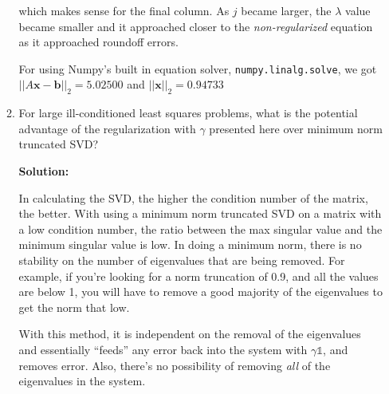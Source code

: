 \documentclass[12pt]{article}
\newcommand{\norm}[1]{\left|\left| #1 \right|\right|}
\newcommand{\vect}{\mathbf}
\newcommand{\Id}{\mathbb{1}}
\begin{document}
\begin{enumerate}
\begin{enumerate}
  which makes sense for the final column. As $j$ became larger, the $\lambda$ value became
  smaller and it approached closer to the {\em non-regularized} equation as it approached
  roundoff errors.

  For using {\sc Numpy}'s built in equation solver, {\tt numpy.linalg.solve}, we got\\
  $\norm{A\vect{x} - \vect{b}}_{2} = 5.02500$ and $\norm{\vect{x}}_{2} = 0.94733$

  \item For large ill-conditioned least squares problems, what is the potential advantage
  of the regularization with $\gamma$ presented here over minimum norm truncated SVD?

  {\bf Solution:}

  In calculating the SVD, the higher the condition number of the matrix, the better.
  With using a minimum norm truncated SVD on a matrix with a low condition number, the
  ratio between the max singular value and the minimum singular value is low. In doing a
  minimum norm, there is no stability on the number of eigenvalues that are being removed.
  For example, if you're looking for a norm truncation of 0.9, and all the values are below 1,
  you will have to remove a good majority of the eigenvalues to get the norm that low.

  With this method, it is independent on the removal of the eigenvalues and essentially
  ``feeds'' any error back into the system with $\gamma\Id$, and removes error. Also,
  there's no possibility of removing {\em all} of the eigenvalues in the system.

\end{enumerate}
\end{enumerate}

\end{document}
